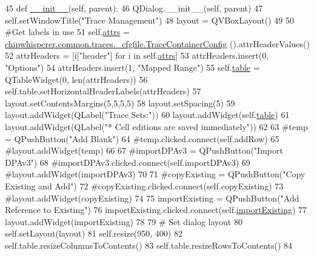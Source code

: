 \begin{DoxyCode}
45     \textcolor{keyword}{def }\hyperlink{classsoftware_1_1chipwhisperer_1_1common_1_1ui_1_1TraceManagerDialog_1_1TraceManagerDialog_a7d57a6ce74f70b11acfe3f9d7537a77e}{\_\_init\_\_}(self, parent):
46         QDialog.\_\_init\_\_(self, parent)
47         self.setWindowTitle(\textcolor{stringliteral}{"Trace Management"})
48         layout = QVBoxLayout()
49 
50         \textcolor{comment}{#Get labels in use}
51         self.\hyperlink{classsoftware_1_1chipwhisperer_1_1common_1_1ui_1_1TraceManagerDialog_1_1TraceManagerDialog_a5e77d358d04f1b0957d70e643390316e}{attrs} = 
      \hyperlink{classsoftware_1_1chipwhisperer_1_1common_1_1traces_1_1__cfgfile_1_1TraceContainerConfig}{chipwhisperer.common.traces.\_cfgfile.TraceContainerConfig}
      ().attrHeaderValues()
52         attrHeaders = [i[\textcolor{stringliteral}{"header"}] \textcolor{keywordflow}{for} i \textcolor{keywordflow}{in} self.\hyperlink{classsoftware_1_1chipwhisperer_1_1common_1_1ui_1_1TraceManagerDialog_1_1TraceManagerDialog_a5e77d358d04f1b0957d70e643390316e}{attrs}]
53         attrHeaders.insert(0, \textcolor{stringliteral}{"Options"})
54         attrHeaders.insert(1, \textcolor{stringliteral}{"Mapped Range"})
55         self.\hyperlink{classsoftware_1_1chipwhisperer_1_1common_1_1ui_1_1TraceManagerDialog_1_1TraceManagerDialog_afcdeac0abef4cfc5f074d2e497c66b27}{table} = QTableWidget(0, len(attrHeaders))
56         self.table.setHorizontalHeaderLabels(attrHeaders)
57         layout.setContentsMargins(5,5,5,5)
58         layout.setSpacing(5)
59         layout.addWidget(QLabel(\textcolor{stringliteral}{"Trace Sets:"}))
60         layout.addWidget(self.\hyperlink{classsoftware_1_1chipwhisperer_1_1common_1_1ui_1_1TraceManagerDialog_1_1TraceManagerDialog_afcdeac0abef4cfc5f074d2e497c66b27}{table})
61         layout.addWidget(QLabel(\textcolor{stringliteral}{"* Cell editions are saved immediately"}))
62 
63         \textcolor{comment}{#temp = QPushButton("Add Blank")}
64         \textcolor{comment}{#temp.clicked.connect(self.addRow)}
65         \textcolor{comment}{#layout.addWidget(temp)}
66 
67         \textcolor{comment}{#importDPAv3 = QPushButton("Import DPAv3")}
68         \textcolor{comment}{#importDPAv3.clicked.connect(self.importDPAv3)}
69         \textcolor{comment}{#layout.addWidget(importDPAv3)}
70 
71         \textcolor{comment}{#copyExisting = QPushButton("Copy Existing and Add")}
72         \textcolor{comment}{#copyExisting.clicked.connect(self.copyExisting)}
73         \textcolor{comment}{#layout.addWidget(copyExisting)}
74 
75         importExisting = QPushButton(\textcolor{stringliteral}{"Add Reference to Existing"})
76         importExisting.clicked.connect(self.\hyperlink{classsoftware_1_1chipwhisperer_1_1common_1_1ui_1_1TraceManagerDialog_1_1TraceManagerDialog_a3f19bdc3b6fd0b001dfbe50e792f0ffe}{importExisting})
77         layout.addWidget(importExisting)
78 
79         \textcolor{comment}{# Set dialog layout}
80         self.setLayout(layout)
81         self.resize(950, 400)
82         self.table.resizeColumnsToContents()
83         self.table.resizeRowsToContents()
84 
\end{DoxyCode}


